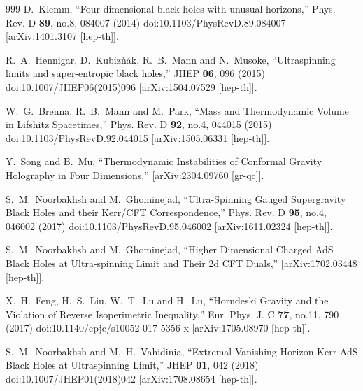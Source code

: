 \documentclass[aps,preprint]{revtex4}%
\begin{document}
\begin{thebibliography}{999}
D.~Klemm,
``Four-dimensional black holes with unusual horizons,''
Phys. Rev. D \textbf{89}, no.8, 084007 (2014)
doi:10.1103/PhysRevD.89.084007
[arXiv:1401.3107 [hep-th]].

R.~A.~Hennigar, D.~Kubiz\v{n}\'ak, R.~B.~Mann and N.~Musoke,
``Ultraspinning limits and super-entropic black holes,''
JHEP \textbf{06}, 096 (2015)
doi:10.1007/JHEP06(2015)096
[arXiv:1504.07529 [hep-th]].

W.~G.~Brenna, R.~B.~Mann and M.~Park,
``Mass and Thermodynamic Volume in Lifshitz Spacetimes,''
Phys. Rev. D \textbf{92}, no.4, 044015 (2015)
doi:10.1103/PhysRevD.92.044015
[arXiv:1505.06331 [hep-th]].

Y.~Song and B.~Mu,
``Thermodynamic Instabilities of Conformal Gravity Holography in Four Dimensions,''
[arXiv:2304.09760 [gr-qc]].

S.~M.~Noorbakhsh and M.~Ghominejad,
``Ultra-Spinning Gauged Supergravity Black Holes and their Kerr/CFT Correspondence,''
Phys. Rev. D \textbf{95}, no.4, 046002 (2017)
doi:10.1103/PhysRevD.95.046002
[arXiv:1611.02324 [hep-th]].

S.~M.~Noorbakhsh and M.~Ghominejad,
``Higher Dimensional Charged AdS Black Holes at Ultra-spinning Limit and Their 2d CFT Duals,''
[arXiv:1702.03448 [hep-th]].

X.~H.~Feng, H.~S.~Liu, W.~T.~Lu and H.~Lu,
``Horndeski Gravity and the Violation of Reverse Isoperimetric Inequality,''
Eur. Phys. J. C \textbf{77}, no.11, 790 (2017)
doi:10.1140/epjc/s10052-017-5356-x
[arXiv:1705.08970 [hep-th]].

S.~M.~Noorbakhsh and M.~H.~Vahidinia,
``Extremal Vanishing Horizon Kerr-AdS Black Holes at Ultraspinning Limit,''
JHEP \textbf{01}, 042 (2018)
doi:10.1007/JHEP01(2018)042
[arXiv:1708.08654 [hep-th]].


\end{thebibliography}
\end{document}
